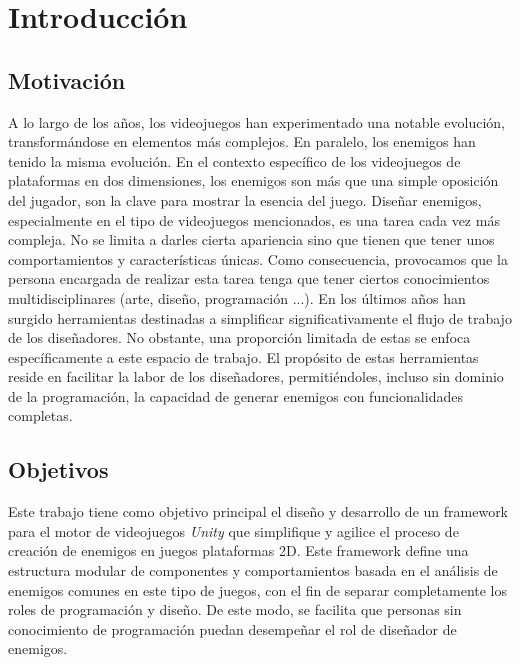 \chapter{Introducción}
\label{cap:introduccion}


\section{Motivación}
A lo largo de los años, los videojuegos han experimentado una notable evolución, transformándose en elementos más complejos. En paralelo, los enemigos han tenido la misma evolución. En el contexto específico de los videojuegos de plataformas en dos dimensiones, los enemigos son más que una simple oposición del jugador, son la clave para mostrar la esencia del juego. Diseñar enemigos, especialmente en el tipo de videojuegos mencionados, es una tarea cada vez más compleja. No se limita a darles cierta apariencia sino que tienen que tener unos comportamientos y características únicas. Como consecuencia, provocamos que la persona encargada de realizar esta tarea tenga que tener ciertos conocimientos multidisciplinares (arte, diseño, programación ...). 
En los últimos años han surgido herramientas destinadas a simplificar significativamente el flujo de trabajo de los diseñadores. No obstante, una proporción limitada de estas se enfoca específicamente a este espacio de trabajo. El propósito de estas herramientas reside en facilitar la labor de los diseñadores, permitiéndoles, incluso sin dominio de la programación, la capacidad de generar enemigos con funcionalidades completas.

\section{Objetivos}
Este trabajo tiene como objetivo principal el diseño y desarrollo de un framework para el motor de videojuegos \textit{Unity} que simplifique y agilice el proceso de creación de enemigos en juegos plataformas 2D. Este framework define una estructura modular de componentes y comportamientos basada en el análisis de enemigos comunes en este tipo de juegos, con el fin de separar completamente los roles de programación y diseño. De este modo, se facilita que personas sin conocimiento de programación puedan desempeñar el rol de diseñador de enemigos.\\

